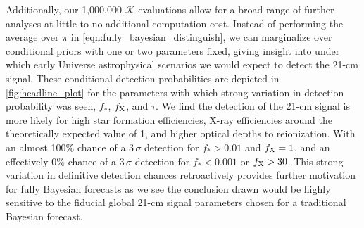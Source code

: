 \documentclass[twocolumn,english,aps,prd,amsmath,amssymb,reprint,floatfix,nofootinbib,showkeys]{revtex4-2}
\newcommand{\br}{\mathcal{K}}
\newif\ifhighlightchanges
\newcommand{\change}[1]{{\ifhighlightchanges\color{red} #1\else #1\fi}}
\begin{document}
Additionally, our 1,000,000 $\br$ evaluations allow for a broad range of further analyses at little to no additional computation cost. 
Instead of performing the average over $\pi$ in \cref{eqn:fully_bayesian_distinguish}, we can marginalize over conditional priors with one or two parameters fixed, giving insight into under which early Universe astrophysical scenarios we would expect to detect the 21-cm signal.
These conditional detection probabilities are depicted in \cref{fig:headline_plot} for the parameters with which strong variation in detection probability was seen, $f_{*}$, $f_{\rm X}$, and $\tau$. 
We find the detection of the 21-cm signal is more likely for high star formation efficiencies, X-ray efficiencies \change{around the theoretically expected value of 1}, and \change{higher} optical depths to reionization. 
With an almost 100\% chance of a 3\,$\sigma$ detection for \change{$f_{*} >0.01$ and $f_{\rm X} = 1$}, \change{and an effectively 0\% chance of  a 3\,$\sigma$ detection for $f_{*} < 0.001$ or $f_{\rm X} > 30$}. 
This strong variation in definitive detection chances retroactively provides further motivation for fully Bayesian forecasts as we see the conclusion drawn would be highly sensitive to the fiducial global 21-cm signal parameters chosen for a traditional Bayesian forecast. 
\end{document}
